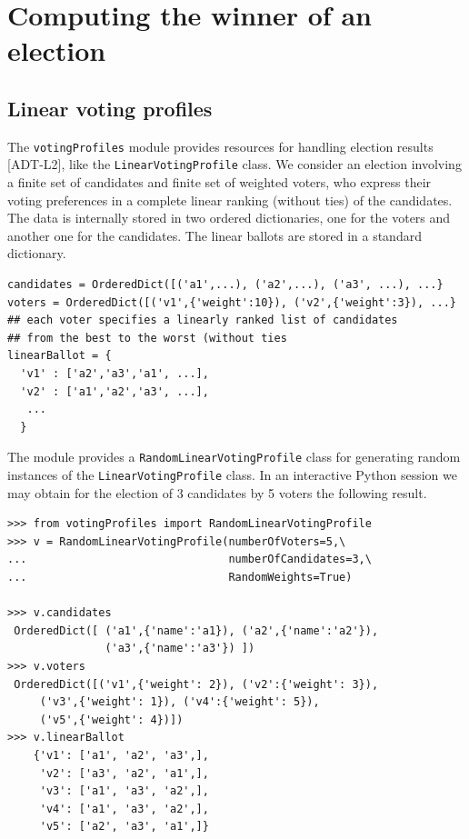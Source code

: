 \chapter{Computing the winner of an election}
\label{sec:7}



\section{Linear voting profiles}
\label{sec:7.1}

The {\tt votingProfiles} module provides resources for handling election results [ADT-L2], like the \texttt{LinearVotingProfile} class. We consider an election involving a finite set of candidates and finite set of weighted voters, who express their voting preferences in a complete linear ranking (without ties) of the candidates. The data is internally stored in two ordered dictionaries, one for the voters and another one for the candidates. The linear ballots are stored in a standard dictionary.

\begin{lstlisting}[basicstyle=\footnotesize]
candidates = OrderedDict([('a1',...), ('a2',...), ('a3', ...), ...}
voters = OrderedDict([('v1',{'weight':10}), ('v2',{'weight':3}), ...}
## each voter specifies a linearly ranked list of candidates
## from the best to the worst (without ties
linearBallot = {
  'v1' : ['a2','a3','a1', ...],
  'v2' : ['a1','a2','a3', ...],
   ...
  }
\end{lstlisting}

The module provides a \texttt{RandomLinearVotingProfile} class for generating random instances of the \texttt{LinearVotingProfile} class. In an interactive Python session we may obtain for the election of 3 candidates by 5 voters the following result.

\begin{lstlisting}[caption={Example of random linear voting profile},label=list:7.1,basicstyle=\footnotesize]
>>> from votingProfiles import RandomLinearVotingProfile
>>> v = RandomLinearVotingProfile(numberOfVoters=5,\
...                               numberOfCandidates=3,\
...                               RandomWeights=True)
   
>>> v.candidates
 OrderedDict([ ('a1',{'name':'a1}), ('a2',{'name':'a2'}),
               ('a3',{'name':'a3'}) ])
>>> v.voters
 OrderedDict([('v1',{'weight': 2}), ('v2':{'weight': 3}), 
     ('v3',{'weight': 1}), ('v4':{'weight': 5}), 
     ('v5',{'weight': 4})])
>>> v.linearBallot
    {'v1': ['a1', 'a2', 'a3',],
     'v2': ['a3', 'a2', 'a1',],
     'v3': ['a1', 'a3', 'a2',],
     'v4': ['a1', 'a3', 'a2',],
     'v5': ['a2', 'a3', 'a1',]} 
 \end{lstlisting}

